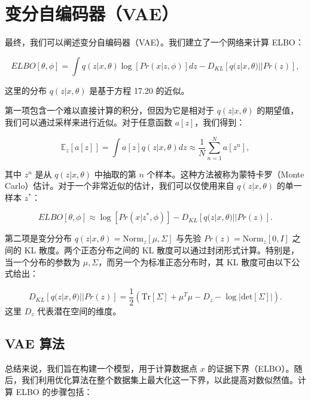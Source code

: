 \section{变分自编码器（VAE）}
最终，我们可以阐述变分自编码器（VAE）。我们建立了一个网络来计算 ELBO：

\begin{equation}
ELBO[\theta, \phi] = \int q(z|x, \theta) \log \left[ Pr(x|z, \phi) \right] dz - D_{KL} \left[ q(z|x, \theta) || Pr(z) \right], 
\end{equation}

这里的分布 \(q(z|x, \theta)\) 是基于方程 17.20 的近似。

第一项包含一个难以直接计算的积分，但因为它是相对于 \(q(z|x, \theta)\) 的期望值，我们可以通过采样来进行近似。对于任意函数 \(a[z]\)，我们得到：

\begin{equation}
\mathbb{E}_z [a[z]] = \int a[z] q(z|x, \theta) dz \approx \frac{1}{N} \sum_{n=1}^N a[z^n], 
\end{equation}

其中 \(z^n\) 是从 \(q(z|x, \theta)\) 中抽取的第 \(n\) 个样本。这种方法被称为蒙特卡罗（Monte Carlo）估计。对于一个非常近似的估计，我们可以仅使用来自 \(q(z|x, \theta)\) 的单一样本 \(z^*\)：

\begin{equation}
ELBO[\theta, \phi] \approx \log \left[ Pr(x|z^*, \phi) \right] - D_{KL} \left[ q(z|x, \theta) || Pr(z) \right]. 
\end{equation}

第二项是变分分布 \(q(z|x, \theta) = \text{Norm}_z[\mu, \Sigma]\) 与先验 \(Pr(z) = \text{Norm}_z[0, I]\) 之间的 KL 散度。两个正态分布之间的 KL 散度可以通过封闭形式计算。特别是，当一个分布的参数为 \(\mu, \Sigma\)，而另一个为标准正态分布时，其 KL 散度可由以下公式给出：

\begin{equation}
D_{KL} \left[ q(z|x, \theta) || Pr(z) \right] = \frac{1}{2} \left( \text{Tr}[\Sigma] + \mu^T \mu - D_z - \log \left| \text{det}[\Sigma] \right| \right). 
\end{equation}
这里 \(D_z\) 代表潜在空间的维度。


\subsection{VAE 算法}
总结来说，我们旨在构建一个模型，用于计算数据点 \(x\) 的证据下界（ELBO）。随后，我们利用优化算法在整个数据集上最大化这一下界，以此提高对数似然值。计算 ELBO 的步骤包括：


